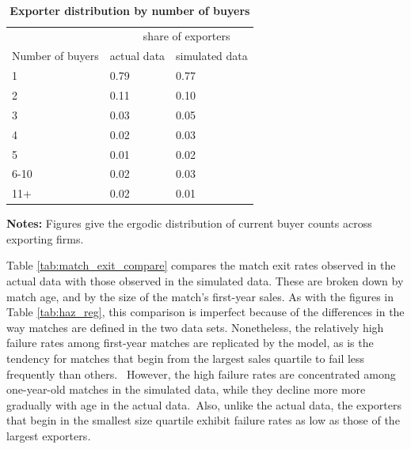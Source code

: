 \documentclass[12pt]{article}
\begin{document}
\begin{table}[tbp]
\caption{\textbf{Exporter distribution by number of buyers}}
\label{tab:client_dist_compare}%
\centering
{\small \ }
\par
{\small %
}
\par
{\small 
\begin{tabular}{lll}
\hline\hline
& \multicolumn{2}{l}{\ \ \ \ \ \ share of exporters} \\ \cline{2-3}
Number of buyers & actual data & simulated data \\ \hline
1 & 0.79 & 0.77 \\ 
2 & 0.11 & 0.10 \\ 
3 & 0.03 & 0.05 \\ 
4 & 0.02 & 0.03 \\ 
5 & 0.01 & 0.02 \\ 
6-10 & 0.02 & 0.03 \\ 
11+ & 0.02 & 0.01 \\ \hline
\end{tabular}
}
\par
{\endcenter%
\begin{tablenotes}
\item \textbf{Notes:} Figures give the ergodic distribution of current buyer counts across exporting firms.
\end{tablenotes}} %
\end{table}

Table \ref{tab:match_exit_compare} compares the match exit rates observed in
the actual data with those observed in the simulated data. These are broken
down by match age, and by the size of the match's first-year sales. As with
the figures in Table \ref{tab:haz_reg}, this comparison is imperfect because
of the differences in the way matches are defined in the two data sets.
Nonetheless, the relatively high failure rates among first-year matches are
replicated by the model, as is the tendency for matches that begin from the
largest sales quartile to fail less frequently than others.\textit{\ }%
However, the high failure rates are concentrated among one-year-old matches
in the simulated data, while they decline more more gradually with age in
the actual data.\textit{\ }Also, unlike the actual data, the exporters that
begin in the smallest size quartile exhibit failure rates as low as those of
the largest exporters\textit{.}
\end{document}
